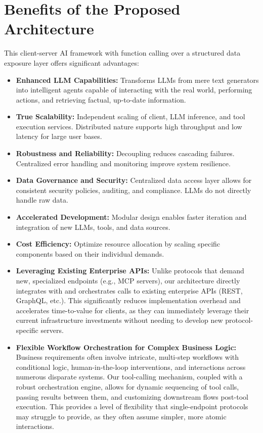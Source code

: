 \documentclass[10pt, a4paper]{article}
\begin{document}
\section{Benefits of the Proposed Architecture}
This client-server AI framework with function calling over a structured data exposure layer offers significant advantages:
\begin{itemize}
    \item \textbf{Enhanced LLM Capabilities:} Transforms LLMs from mere text generators into intelligent agents capable of interacting with the real world, performing actions, and retrieving factual, up-to-date information.
    \item \textbf{True Scalability:} Independent scaling of client, LLM inference, and tool execution services. Distributed nature supports high throughput and low latency for large user bases.
    \item \textbf{Robustness and Reliability:} Decoupling reduces cascading failures. Centralized error handling and monitoring improve system resilience.
    \item \textbf{Data Governance and Security:} Centralized data access layer allows for consistent security policies, auditing, and compliance. LLMs do not directly handle raw data.
    \item \textbf{Accelerated Development:} Modular design enables faster iteration and integration of new LLMs, tools, and data sources.
    \item \textbf{Cost Efficiency:} Optimize resource allocation by scaling specific components based on their individual demands.
    \item \textbf{Leveraging Existing Enterprise APIs:} Unlike protocols that demand new, specialized endpoints (e.g., MCP servers), our architecture directly integrates with and orchestrates calls to existing enterprise APIs (REST, GraphQL, etc.). This significantly reduces implementation overhead and accelerates time-to-value for clients, as they can immediately leverage their current infrastructure investments without needing to develop new protocol-specific servers.
    \item \textbf{Flexible Workflow Orchestration for Complex Business Logic:} Business requirements often involve intricate, multi-step workflows with conditional logic, human-in-the-loop interventions, and interactions across numerous disparate systems. Our tool-calling mechanism, coupled with a robust orchestration engine, allows for dynamic sequencing of tool calls, passing results between them, and customizing downstream flows post-tool execution. This provides a level of flexibility that single-endpoint protocols may struggle to provide, as they often assume simpler, more atomic interactions.

\end{itemize}
\end{document}
